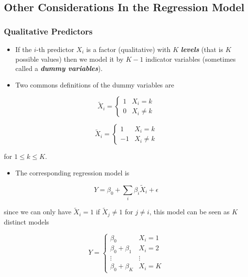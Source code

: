 \documentclass[11pt]{article}
\providecommand{\tightlist}{%
      \setlength{\itemsep}{0pt}\setlength{\parskip}{0pt}}
\begin{document}
    \hypertarget{other-considerations-in-the-regression-model}{%
\subsection{Other Considerations In the Regression
Model}\label{other-considerations-in-the-regression-model}}

    \hypertarget{qualitative-predictors}{%
\subsubsection{Qualitative Predictors}\label{qualitative-predictors}}

    \begin{itemize}
\item
  If the \(i\)-th predictor \(X_i\) is a factor (qualitative) with \(K\)
  \textbf{\emph{levels}} (that is \(K\) possible values) then we model
  it by \(K-1\) indicator variables (sometimes called a
  \textbf{\emph{dummy variables}}).
\item
  Two commons definitions of the dummy variables are
\end{itemize}

\[ \tilde{X}_{i} = \begin{cases} 1 & X_i = k\\ 0 & X_i \neq k \end{cases}\]

\[ \tilde{X}_{i} = \begin{cases} 1 & X_i = k\\ -1 & X_i \neq k \end{cases}\]

for \(1 \leqslant k \leqslant K\).

\begin{itemize}
\tightlist
\item
  The corresponding regression model is
\end{itemize}

\[ Y = \beta_0 + \sum_{i} \beta_i\tilde{X}_i + \epsilon \]

since we can only have \(\tilde{X}_i = 1\) if \(\tilde{X}_j \neq 1\) for
\(j \neq i\), this model can be seen as \(K\) distinct models

\[ Y = \begin{cases} \beta_0 & X_i = 1 \\ \beta_0 + \beta_1 & X_i = 2 \\ \vdots & \vdots \\ \beta_0 + \beta_K & X_i = K
\end{cases}
\]
\end{document}
